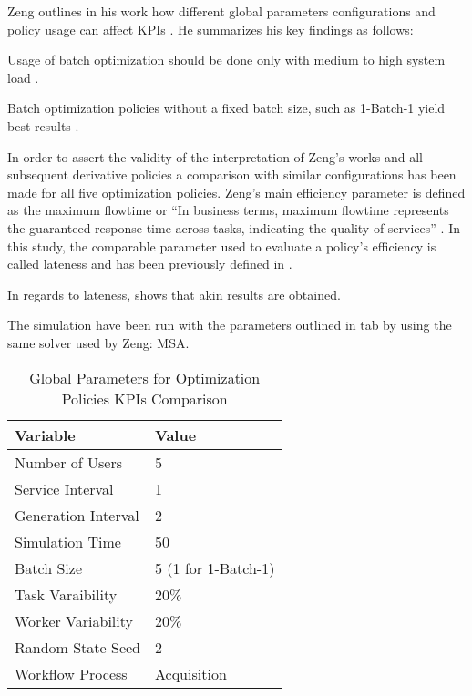\documentclass{seal_thesis}
\begin{document}
Zeng outlines in his work how different global parameters configurations and policy usage can affect KPIs \cite[pp. 18-22]{Zeng2005}. He summarizes his key findings as follows:
\begin{enumerate*}
	\item Usage of batch optimization should be done only with medium to high system load \cite[p. 24]{Zeng2005}.
	\item Batch optimization policies without a fixed batch size, such as 1-Batch-1 yield best results \cite[p. 24]{Zeng2005}.
\end{enumerate*}

In order to assert the validity of the interpretation of Zeng's works and all subsequent derivative policies a comparison with similar configurations has been made for all five optimization policies. Zeng's main efficiency parameter is defined as the maximum flowtime or ``In business terms, maximum flowtime represents the guaranteed response time across tasks, indicating the quality of services'' \cite[p. 17]{Zeng2005}. In this study, the comparable parameter used to evaluate a policy's efficiency is called lateness and has been previously defined in .

In regards to lateness,  shows that akin results are obtained.


The simulation have been run with the parameters outlined in tab by using the same solver used by Zeng: MSA.

\begin{table}[htb]
\centering
\begin{tabular}{@{}ll@{}}
\toprule
Variable            & Value     \\ \midrule
Number of Users     & 5                 \\
Service Interval    & 1              \\
Generation Interval & 2                 \\
Simulation Time     & 50              \\
Batch Size          & 5 (1 for 1-Batch-1)               \\
Task Varaibility    & 20\%             \\
Worker Variability  & 20\%              \\
Random State Seed   & 2                 \\
Workflow Process    & Acquisition       \\ \bottomrule
\end{tabular}
\caption{Global Parameters for Optimization Policies KPIs Comparison}
\label{tab:global_parameters_kpis_comp}
\end{table}
\end{document}
